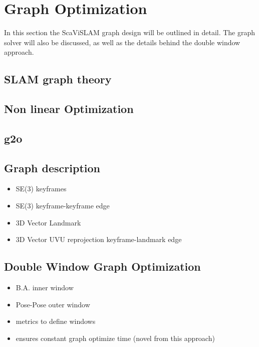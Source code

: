 \section{Graph Optimization}
\label{sec:scavislam_graph}

In this section the ScaViSLAM graph design will be outlined in detail.  The graph solver will also
be discussed, as well as the details behind the double window approach.

\subsection{SLAM graph theory}
\subsection{Non linear Optimization}
\subsection{g2o}
\subsection{Graph description}
\begin{itemize}
\itemsep0em
 \item SE(3) keyframes
 \item SE(3) keyframe-keyframe edge
 \item 3D Vector Landmark
 \item 3D Vector UVU reprojection keyframe-landmark edge
\end{itemize}

\subsection{Double Window Graph Optimization}
\begin{itemize}
\itemsep0em
 \item B.A. inner window
 \item Pose-Pose outer window
 \item metrics to define windows
 \item ensures constant graph optimize time (novel from this approach)
\end{itemize}
